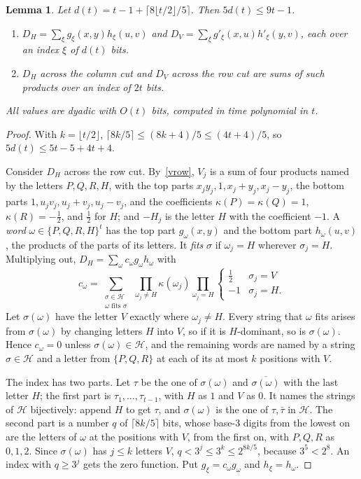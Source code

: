 \documentclass[10pt]{article}
\newtheorem{lemma}[theorem]{Lemma}
\newcommand{\Hs}{\mathcal H}
\begin{document}
\begin{lemma}\label{lem:dom}
Let $d(t)=t-1+\lceil8\lfloor t/2\rfloor/5\rceil$. Then $5d(t)\le9t-1$.
\begin{enumerate}\setlength{\itemsep}{0pt}
\item $D_H=\sum_\xi g_\xi(x,y)h_\xi(u,v)$ and $D_V=\sum_\xi g'_\xi(x,u)h'_\xi(y,v)$, each over an index $\xi$ of $d(t)$ bits.
\item $D_H$ across the column cut and $D_V$ across the row cut are sums of such products over an index of $2t$ bits.
\end{enumerate}
All values are dyadic with $O(t)$ bits, computed in time polynomial in $t$.
\end{lemma}
\begin{proof}
With $k=\lfloor t/2\rfloor$, $\lceil8k/5\rceil\le(8k+4)/5\le(4t+4)/5$, so $5d(t)\le5t-5+4t+4$.

Consider $D_H$ across the row cut. By~\eqref{vrow}, $V_j$ is a sum of four products named by the letters $P,Q,R,H$, with the top parts $x_jy_j,1,x_j+y_j,x_j-y_j$, the bottom parts $1,u_jv_j,u_j+v_j,u_j-v_j$, and the coefficients $\kappa(P)=\kappa(Q)=1$, $\kappa(R)=-\frac12$, and $\frac12$ for $H$; and $-H_j$ is the letter $H$ with the coefficient $-1$. A \emph{word} $\omega\in\{P,Q,R,H\}^t$ has the top part $g_\omega(x,y)$ and the bottom part $h_\omega(u,v)$, the products of the parts of its letters. It \emph{fits} $\sigma$ if $\omega_j=H$ wherever $\sigma_j=H$. Multiplying out, $D_H=\sum_\omega c_\omega g_\omega h_\omega$ with
\[
c_\omega=\sum_{\substack{\sigma\in\Hs\\\omega\text{ fits }\sigma}}\ \prod_{\omega_j\ne H}\kappa(\omega_j)\prod_{\omega_j=H}\begin{cases}\frac12&\sigma_j=V\\-1&\sigma_j=H.\end{cases}
\]
Let $\sigma(\omega)$ have the letter $V$ exactly where $\omega_j\ne H$. Every string that $\omega$ fits arises from $\sigma(\omega)$ by changing letters $H$ into $V$, so if it is $H$-dominant, so is $\sigma(\omega)$. Hence $c_\omega=0$ unless $\sigma(\omega)\in\Hs$, and the remaining words are named by a string $\sigma\in\Hs$ and a letter from $\{P,Q,R\}$ at each of its at most $k$ positions with $V$.

The index has two parts. Let $\tau$ be the one of $\sigma(\omega)$ and $\overline{\sigma(\omega)}$ with the last letter $H$; the first part is $\tau_1,\dots,\tau_{t-1}$, with $H$ as $1$ and $V$ as $0$. It names the strings of $\Hs$ bijectively: append $H$ to get $\tau$, and $\sigma(\omega)$ is the one of $\tau,\bar\tau$ in $\Hs$. The second part is a number $q$ of $\lceil8k/5\rceil$ bits, whose base-$3$ digits from the lowest on are the letters of $\omega$ at the positions with $V$, from the first on, with $P,Q,R$ as $0,1,2$. Since $\sigma(\omega)$ has $j\le k$ letters $V$, $q<3^j\le3^k\le2^{8k/5}$, because $3^5<2^8$. An index with $q\ge3^j$ gets the zero function. Put $g_\xi=c_\omega g_\omega$ and $h_\xi=h_\omega$.


\end{proof}
\end{document}
